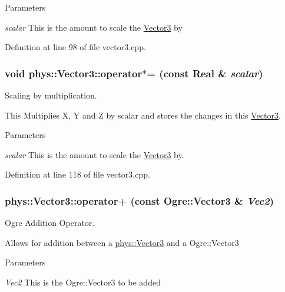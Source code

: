 \begin{DoxyParams}{Parameters}
\item[{\em scalar}]This is the amount to scale the \hyperlink{classphys_1_1Vector3}{Vector3} by \end{DoxyParams}


Definition at line 98 of file vector3.cpp.

\hypertarget{classphys_1_1Vector3_ae04a2cdca40ac24180d6fb62babb34d7}{
\subsubsection[{operator$\ast$=}]{\setlength{\rightskip}{0pt plus 5cm}void phys::Vector3::operator$\ast$= (const {\bf Real} \& {\em scalar})}}
\label{d5/d6a/classphys_1_1Vector3_ae04a2cdca40ac24180d6fb62babb34d7}


Scaling by multiplication. 

This Multiplies X, Y and Z by scalar and stores the changes in this \hyperlink{classphys_1_1Vector3}{Vector3}. 
\begin{DoxyParams}{Parameters}
\item[{\em scalar}]This is the amount to scale the \hyperlink{classphys_1_1Vector3}{Vector3} by. \end{DoxyParams}


Definition at line 118 of file vector3.cpp.

\hypertarget{classphys_1_1Vector3_a14ca2ae8bbe9ebefd298486b2a2ba5c9}{
\subsubsection[{operator+}]{ phys::Vector3::operator+ (const Ogre::Vector3 \& {\em Vec2})}}
\label{d5/d6a/classphys_1_1Vector3_a14ca2ae8bbe9ebefd298486b2a2ba5c9}


Ogre Addition Operator. 

Allows for addition between a \hyperlink{classphys_1_1Vector3}{phys::Vector3} and a Ogre::Vector3 
\begin{DoxyParams}{Parameters}
\item[{\em Vec2}]This is the Ogre::Vector3 to be added \end{DoxyParams}


